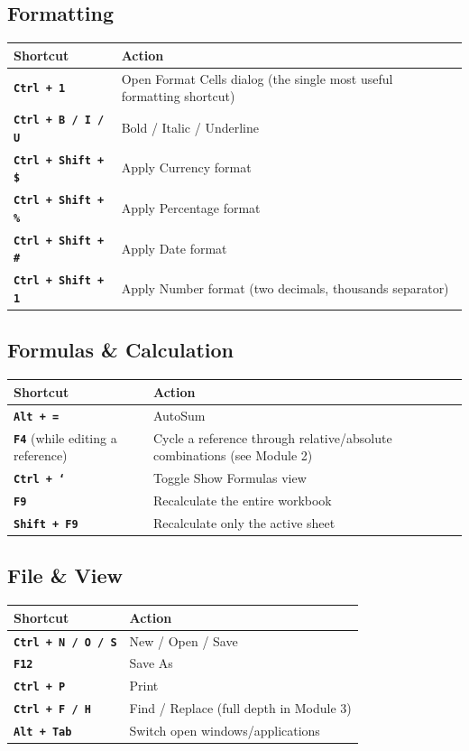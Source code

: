 \documentclass[11pt,a4paper]{article}
\newcommand{\key}[1]{\texttt{\colorbox{black!8}{\textbf{#1}}}}
\begin{document}
\subsection{Formatting}

\begin{center}
\begin{tabular}{@{}p{5.4cm}p{6.6cm}@{}}
\toprule
\textbf{Shortcut} & \textbf{Action} \\
\midrule
\key{Ctrl + 1} & Open Format Cells dialog (the single most useful formatting shortcut) \\
\key{Ctrl + B / I / U} & Bold / Italic / Underline \\
\key{Ctrl + Shift + \$} & Apply Currency format \\
\key{Ctrl + Shift + \%} & Apply Percentage format \\
\key{Ctrl + Shift + \#} & Apply Date format \\
\key{Ctrl + Shift + 1} & Apply Number format (two decimals, thousands separator) \\
\bottomrule
\end{tabular}
\end{center}

\subsection{Formulas \& Calculation}

\begin{center}
\begin{tabular}{@{}p{5.4cm}p{6.6cm}@{}}
\toprule
\textbf{Shortcut} & \textbf{Action} \\
\midrule
\key{Alt + =} & AutoSum \\
\key{F4} (while editing a reference) & Cycle a reference through relative/absolute combinations (see Module 2) \\
\key{Ctrl + `} & Toggle Show Formulas view \\
\key{F9} & Recalculate the entire workbook \\
\key{Shift + F9} & Recalculate only the active sheet \\
\bottomrule
\end{tabular}
\end{center}

\subsection{File \& View}

\begin{center}
\begin{tabular}{@{}p{5.4cm}p{6.6cm}@{}}
\toprule
\textbf{Shortcut} & \textbf{Action} \\
\midrule
\key{Ctrl + N / O / S} & New / Open / Save \\
\key{F12} & Save As \\
\key{Ctrl + P} & Print \\
\key{Ctrl + F / H} & Find / Replace (full depth in Module 3) \\
\key{Alt + Tab} & Switch open windows/applications \\
\bottomrule
\end{tabular}
\end{center}
\end{document}
